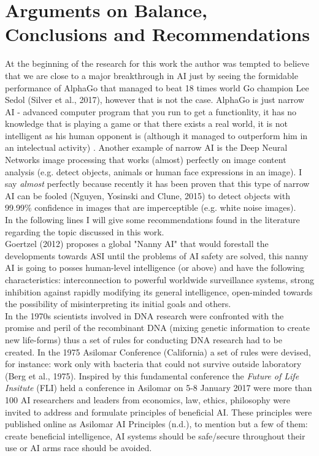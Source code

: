 \documentclass[11pt]{article}
\begin{document}
\section*{Arguments on Balance, Conclusions and Recommendations}
	At the beginning of the research for this work the author was tempted to believe that we are close to a major breakthrough in AI just by seeing the formidable performance of AlphaGo that managed to beat 18 times world Go champion Lee Sedol (Silver et al., 2017), however that is not the case. AlphaGo is just narrow AI - advanced computer program that you run to get a functionlity, it has no knowledge that is playing a game or that there exists a real world, it is not intelligent as his human opponent is (although it managed to outperform him in an intelectual activity)
. Another example of narrow AI is the Deep Neural Networks image processing that works (almost) perfectly on image content analysis (e.g. detect objects, animals or human face expressions in an image). I say \textit{almost}  perfectly because recently it has been proven that this type of narrow AI can be fooled (Nguyen, Yosinski and Clune, 2015) to detect objects with 99.99\% confidence in images that are imperceptible (e.g. white noise images).  \\

	\indent
	In the following lines I will give some recommendations found in the literature regarding the topic discussed in this work.\\
	\indent
	Goertzel (2012) proposes a global "Nanny AI" that would forestall the developments towards ASI until the problems of AI safety are solved, this nanny AI is going to posses human-level intelligence (or above) and have the following characteristics: interconnection to powerful worldwide surveillance systems, strong inhibition against rapidly modifying its general intelligence, open-minded towards the possibility of misinterpreting its initial goals and others.  \\
	\indent
	In the 1970s scientists involved in DNA research were confronted with the promise and peril of the recombinant DNA (mixing genetic information to create new life-forms) thus a set of rules for conducting DNA research had to be created. In the 1975 Asilomar Conference (California) a set of rules were devised, for instance: work only with bacteria that could not survive outside laboratory (Berg et al., 1975). Inspired by this fundamental conference the \textit{Future of Life Insitute} (FLI) held a conference in Asilomar on 5-8 January 2017 were more than 100 AI researchers and leaders from economics, law, ethics, philosophy were invited to address and formulate principles of beneficial AI. These principles were published online  as Asilomar AI Principles (n.d.), to mention but a few of them: create beneficial intelligence, AI systems should be safe/secure throughout their use or AI arms race should be avoided.  \\
\end{document}
